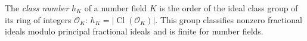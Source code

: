 
The \emph{class number} $h_K$ of a number field $K$ is the order of the ideal class group of its ring of integers $\mathcal O_K$: $h_K=|\operatorname{Cl}(\mathcal O_K)|$. This group classifies nonzero fractional ideals modulo principal fractional ideals and is finite for number fields.
